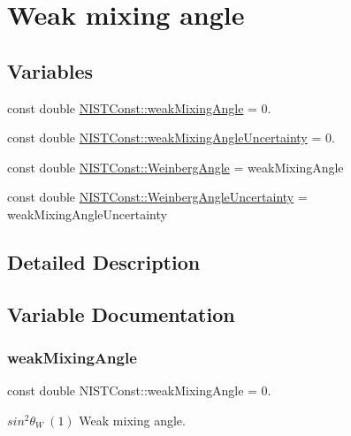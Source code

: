 \hypertarget{group___weak_mixing_angle}{}\section{Weak mixing angle}
\label{group___weak_mixing_angle}
\subsection*{Variables}
\begin{DoxyCompactItemize}
\item 
const double \hyperlink{group___weak_mixing_angle_gaf4037fe32df08c9c7eccd8487b5eab34}{N\+I\+S\+T\+Const\+::weak\+Mixing\+Angle} = 0.
\item 
const double \hyperlink{group___weak_mixing_angle_ga6b461a8ed9af6322050586b5919cda98}{N\+I\+S\+T\+Const\+::weak\+Mixing\+Angle\+Uncertainty} = 0.
\item 
const double \hyperlink{group___weak_mixing_angle_gaa27d3628b9e064d9d8d998be81b6adf0}{N\+I\+S\+T\+Const\+::\+Weinberg\+Angle} = weak\+Mixing\+Angle
\item 
const double \hyperlink{group___weak_mixing_angle_ga923e5bc037fee920767800b7cc9ad724}{N\+I\+S\+T\+Const\+::\+Weinberg\+Angle\+Uncertainty} = weak\+Mixing\+Angle\+Uncertainty
\end{DoxyCompactItemize}


\subsection{Detailed Description}


\subsection{Variable Documentation}
\mbox{\label{group___weak_mixing_angle_gaf4037fe32df08c9c7eccd8487b5eab34}} 
\subsubsection{\texorpdfstring{weak\+Mixing\+Angle}{weakMixingAngle}}
{\footnotesize\ttfamily const double N\+I\+S\+T\+Const\+::weak\+Mixing\+Angle = 0.}

$sin^2 \theta_W \ (1)$ Weak mixing angle. \mbox{\label{group___weak_mixing_angle_ga6b461a8ed9af6322050586b5919cda98}} 
